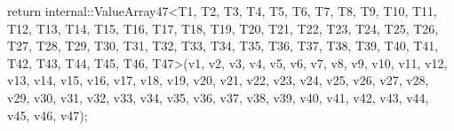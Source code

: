 \begin{DoxyCode}
                                                                            {
  return internal::ValueArray47<T1, T2, T3, T4, T5, T6, T7, T8, T9, T10, T11,
      T12, T13, T14, T15, T16, T17, T18, T19, T20, T21, T22, T23, T24, T25,
      T26, T27, T28, T29, T30, T31, T32, T33, T34, T35, T36, T37, T38, T39,
      T40, T41, T42, T43, T44, T45, T46, T47>(v1, v2, v3, v4, v5, v6, v7, v8,
      v9, v10, v11, v12, v13, v14, v15, v16, v17, v18, v19, v20, v21, v22, v23,
      v24, v25, v26, v27, v28, v29, v30, v31, v32, v33, v34, v35, v36, v37,
      v38, v39, v40, v41, v42, v43, v44, v45, v46, v47);
}
\end{DoxyCode}
\hypertarget{namespacetesting_af3cdf373b137d357bb3a814c097bcd06}{
}
